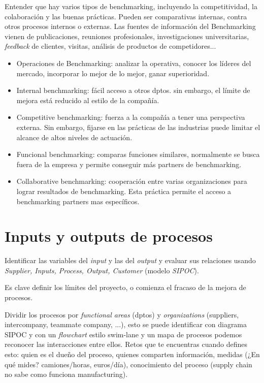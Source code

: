 \documentclass[oneside]{book}
\begin{document}
Entender que hay varios tipos de benchmarking, incluyendo la competitividad, la colaboración y las buenas prácticas.
Pueden ser comparativas internas, contra otros procesos internos o externas. Las fuentes de información del Benchmarking vienen de publicaciones, reuniones profesionales, investigaciones universitarias, \textit{feedback} de clientes, visitas, análisis de productos de competidores...
\begin{itemize}
\item Operaciones de Benchmarking: analizar la operativa, conocer los líderes del mercado, incorporar lo mejor de lo mejor, ganar superioridad. 

\item Internal benchmarking: fácil acceso a otros dptos. sin embargo, el límite de mejora está reducido al estilo de la compañía.

\item Competitive benchmarking: fuerza a la compañía a tener una perspectiva externa. Sin embargo, fijarse en las prácticas de las industrias puede limitar el alcance de altos niveles de actuación.

\item Funcional benchmarking: comparas funciones similares, normalmente se busca fuera de la empresa y permite conseguir más partners de benchmarking.

\item Collaborative benchmarking: cooperación entre varias organizaciones para lograr resultados de benchmarking. Esta práctica permite el acceso a benchmarking partners  mas específicos.  
\end{itemize}
\section{Inputs y outputs de procesos}

Identificar las variables del \textit{input} y las del \textit{output} y evaluar sus relaciones usando \textit{Supplier, Inputs, Process, Output, Customer} (modelo \textit{SIPOC}).

Es clave definir los límites del proyecto, o comienza el fracaso de la mejora de procesos.

Dividir los procesos por \textit{functional areas} (dptos) y \textit{organizations} (suppliers, intercompany, teammate company, ...), esto se puede identificar con diagrama SIPOC y con un \textit{flowchart} estilo swim-lane y un mapa de procesos podemos reconocer las interacciones entre ellos. Retos que te encuentras cuando defines esto: quien es el dueño del proceso, quienes comparten información, medidas (¿En qué mides? camiones/horas, euros/día), conocimiento del proceso (supply chain no sabe como funciona manufacturing).
\end{document}
